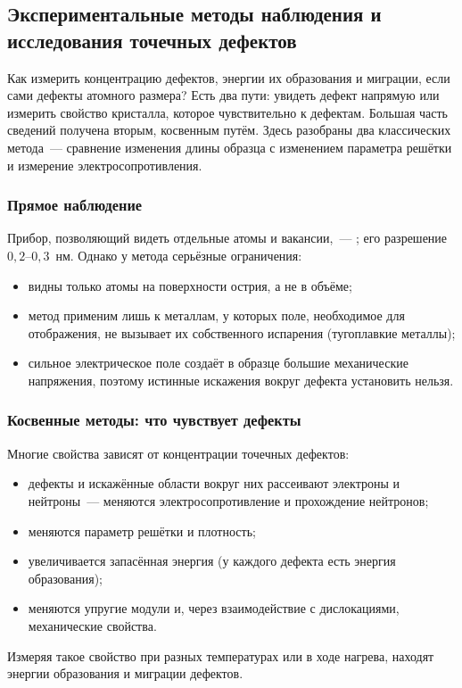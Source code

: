 \subsection{Экспериментальные методы наблюдения и исследования точечных дефектов}\label{ssec:exp-methods}

\begin{orientir}
Как измерить концентрацию дефектов, энергии их образования и миграции,
если сами дефекты атомного размера? Есть два пути: увидеть дефект
напрямую или измерить свойство кристалла, которое чувствительно к
дефектам. Большая часть сведений получена вторым, косвенным путём. Здесь
разобраны два классических метода~— сравнение изменения длины образца с
изменением параметра решётки и измерение электросопротивления.
\end{orientir}

\subsubsection{Прямое наблюдение}

Прибор, позволяющий видеть отдельные атомы и вакансии,~—
; его разрешение
$0{,}2$--$0{,}3$~нм. Однако у метода серьёзные ограничения:
\begin{itemize}
\item видны только атомы на поверхности острия, а не в объёме;
\item метод применим лишь к металлам, у которых поле, необходимое для
отображения, не вызывает их собственного испарения (тугоплавкие металлы);
\item сильное электрическое поле создаёт в образце большие механические
напряжения, поэтому истинные искажения вокруг дефекта установить нельзя.
\end{itemize}

\subsubsection{Косвенные методы: что чувствует дефекты}

Многие свойства зависят от концентрации точечных дефектов:
\begin{itemize}
\item дефекты и искажённые области вокруг них рассеивают электроны и
нейтроны~— меняются электросопротивление и прохождение нейтронов;
\item меняются параметр решётки и плотность;
\item увеличивается запасённая энергия (у каждого дефекта есть энергия
образования);
\item меняются упругие модули и, через взаимодействие с дислокациями,
механические свойства.
\end{itemize}
Измеряя такое свойство при разных температурах или в ходе нагрева,
находят энергии образования и миграции дефектов.

